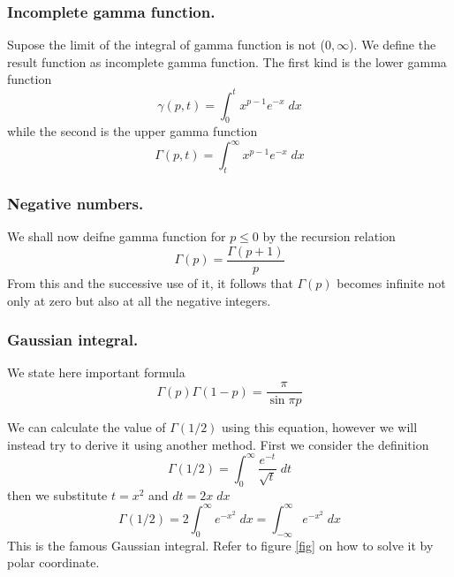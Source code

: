\documentclass[../../main.tex]{subfiles}
\begin{document}
\subsubsection{Incomplete gamma function.} Supose the limit of the integral of gamma function is not ($0,\infty$). We define the result function as incomplete gamma function. The first kind is the lower gamma function 
\begin{equation*}
    \gamma (p,t)=\int_{0}^{t}x^{p-1}e^{-x}\;dx
\end{equation*}
while the second is the upper gamma function
\begin{equation*}
    \Gamma (p,t)=\int_{t }^{\infty}x^{p-1}e^{-x}\;dx
\end{equation*}

\subsubsection{Negative numbers.} We shall now deifne gamma function for $p\leq 0$ by the recursion 
relation 
\begin{equation*}
    \Gamma(p)=\frac{\Gamma(p+1)}{p}
\end{equation*}
From this and the successive use of it, it follows that $\Gamma(p)$ becomes infinite not only at zero but also at all the negative integers.

\subsubsection{Gaussian integral.} We state here important formula
\begin{equation*}
    \Gamma(p)\Gamma(1-p)=\frac{\pi}{\sin \pi p}
\end{equation*}

We can calculate the value of $\Gamma(1/2)$ using this equation, however we will instead try to derive it using another method. First we consider the definition
\begin{equation*}
    \Gamma(1/2)=\int_{0}^{\infty}\frac{e^{-t}}{\sqrt{t}}\;dt
\end{equation*}
then we substitute $t=x^2$ and $dt=2x\;dx$
\begin{equation*}
    \Gamma(1/2)=2\int_{0}^{\infty}e^{-x^2}\;dx=\int_{-\infty}^{\infty}e^{-x^2}\;dx
\end{equation*}
This is the famous Gaussian integral. Refer to figure \ref{fig} on how to solve it by polar coordinate. 
\end{document}
